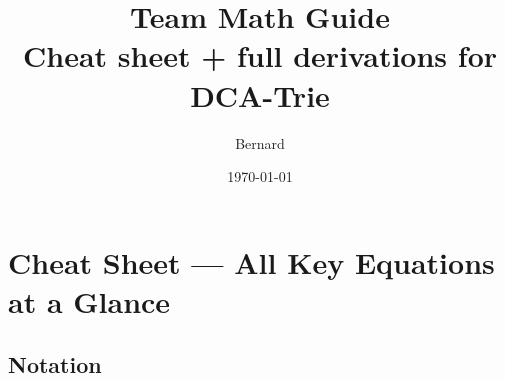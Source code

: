 \documentclass[11pt,a4paper]{article}
\title{Team Math Guide\\
\normalsize Cheat sheet + full derivations for DCA-Trie}
\author{Bernard}
\date{\today}
\begin{document}
\maketitle

\newpage
\section*{Cheat Sheet --- All Key Equations at a Glance}

\subsection*{Notation}
\end{document}
